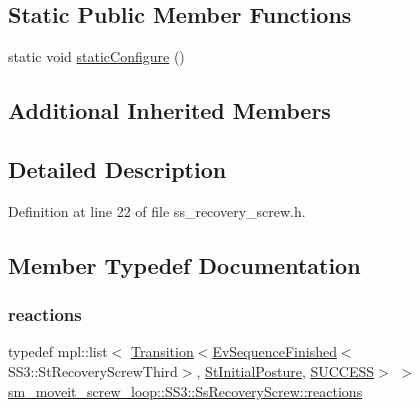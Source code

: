 \subsection*{Static Public Member Functions}
\begin{DoxyCompactItemize}
\item 
static void \hyperlink{structsm__moveit__screw__loop_1_1SS3_1_1SsRecoveryScrew_a76a6b8e0ef9b53e93014b19cddc21936}{static\+Configure} ()
\end{DoxyCompactItemize}
\subsection*{Additional Inherited Members}


\subsection{Detailed Description}


Definition at line 22 of file ss\+\_\+recovery\+\_\+screw.\+h.



\subsection{Member Typedef Documentation}
\mbox{\label{structsm__moveit__screw__loop_1_1SS3_1_1SsRecoveryScrew_a33ad06607c3b68b61f6ed335733228e2}} 
\subsubsection{\texorpdfstring{reactions}{reactions}}
{\footnotesize\ttfamily typedef mpl\+::list$<$ \hyperlink{classsmacc_1_1Transition}{Transition}$<$\hyperlink{structsmacc_1_1default__events_1_1EvSequenceFinished}{Ev\+Sequence\+Finished}$<$S\+S3\+::\+St\+Recovery\+Screw\+Third$>$, \hyperlink{structsm__moveit__screw__loop_1_1StInitialPosture}{St\+Initial\+Posture}, \hyperlink{structsmacc_1_1default__transition__tags_1_1SUCCESS}{S\+U\+C\+C\+E\+SS}$>$ $>$ \hyperlink{structsm__moveit__screw__loop_1_1SS3_1_1SsRecoveryScrew_a33ad06607c3b68b61f6ed335733228e2}{sm\+\_\+moveit\+\_\+screw\+\_\+loop\+::\+S\+S3\+::\+Ss\+Recovery\+Screw\+::reactions}}



